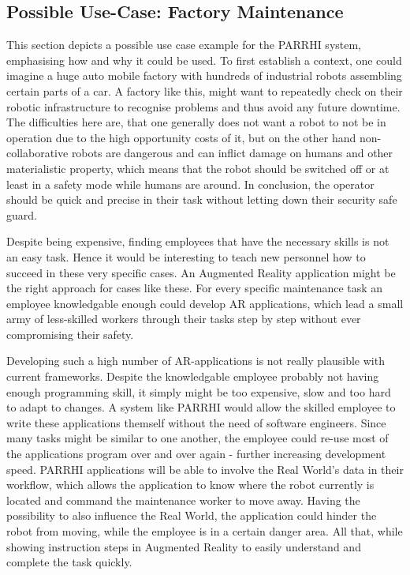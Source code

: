 \subsection{Possible Use-Case: Factory Maintenance}\label{Section:UseCaseDefinition}
This section depicts a possible use case example for the PARRHI system, emphasising how and why it could be used. To first establish a context, one could imagine a huge auto mobile factory with hundreds of industrial robots assembling certain parts of a car. A factory like this, might want to repeatedly check on their robotic infrastructure to recognise problems and thus avoid any future downtime. The difficulties here are, that one generally does not want a robot to not be in operation due to the high opportunity costs of it, but on the other hand non-collaborative robots are dangerous and can inflict damage on humans and other materialistic property, which means that the robot should be switched off or at least in a safety mode while humans are around. In conclusion, the operator should be quick and precise in their task without letting down their security safe guard.

Despite being expensive, finding employees that have the necessary skills is not an easy task. Hence it would be interesting to teach new personnel how to succeed in these very specific cases. An Augmented Reality application might be the right approach for cases like these. For every specific maintenance task an employee knowledgable enough could develop AR applications, which lead a small army of less-skilled workers through their tasks step by step without ever compromising their safety.

Developing such a high number of AR-applications is not really plausible with current frameworks. Despite the knowledgable employee probably not having enough programming skill, it simply might be too expensive, slow and too hard to adapt to changes. A system like PARRHI would allow the skilled employee to write these applications themself without the need of software engineers. Since many tasks might be similar to one another, the employee could re-use most of the applications program over and over again - further increasing development speed. PARRHI applications will be able to involve the Real World's data in their workflow, which allows the application to know where the robot currently is located and command the maintenance worker to move away. Having the possibility to also influence the Real World, the application could hinder the robot from moving, while the employee is in a certain danger area. All that, while showing instruction steps in Augmented Reality to easily understand and complete the task quickly.

